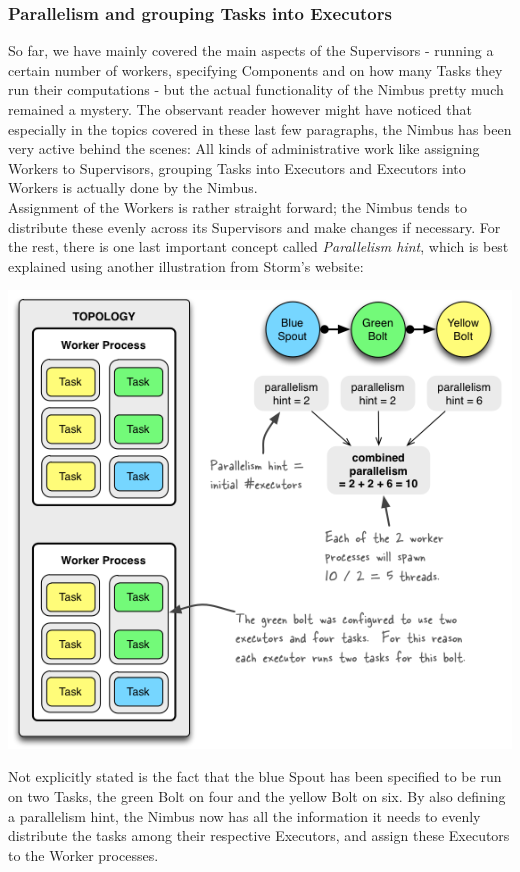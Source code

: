 \documentclass[12pt,a4paper]{article}
\begin{document}
\subsubsection{Parallelism and grouping Tasks into Executors}

So far, we have mainly covered the main aspects of the Supervisors - running a certain number of workers, specifying Components and on how many Tasks they run their computations - but the actual functionality of the Nimbus pretty much remained a mystery. The observant reader however might have noticed that especially in the topics covered in these last few paragraphs, the Nimbus has been very active behind the scenes: All kinds of administrative work like assigning Workers to Supervisors, grouping Tasks into Executors and Executors into Workers is actually done by the Nimbus.\\
\indent Assignment of the Workers is rather straight forward; the Nimbus tends to distribute these evenly across its Supervisors and make changes if necessary. For the rest, there is one last important concept called \textit{Parallelism hint}, which is best explained using another illustration from Storm's website:\\
\begin{center}
\includegraphics[scale=1]{images/example-of-a-running-topology.png}
\end{center}
Not explicitly stated is the fact that the blue Spout has been specified to be run on two Tasks, the green Bolt on four and the yellow Bolt on six. By also defining a parallelism hint, the Nimbus now has all the information it needs to evenly distribute the tasks among their respective Executors, and assign these Executors to the Worker processes.
\end{document}
